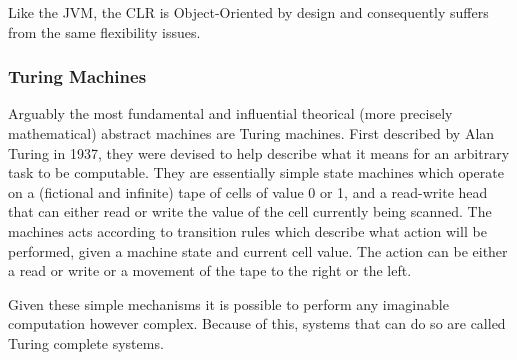 Like the JVM, the CLR is Object-Oriented by design and consequently suffers from
the same flexibility issues.

\subsubsection{Turing Machines}

Arguably the most fundamental and influential theorical (more precisely
mathematical) abstract machines are Turing machines. First described by Alan
Turing in 1937\cite{sep-turing-machine}, they were devised to help describe what
it means for an arbitrary task to be computable. They are essentially simple
state machines which operate on a (fictional and infinite) tape of cells of
value 0 or 1, and a read-write head that can either read or write the value of
the cell currently being scanned\cite{sep-turing-machine}. The machines acts
according to transition rules which describe what action will be performed,
given a machine state and current cell value. The action can be either a read or
write or a movement of the tape to the right or the left.

Given these simple mechanisms it is possible to perform any imaginable
computation however complex. Because of this, systems that can do so are called
Turing complete systems\cite{NEEDED}.


